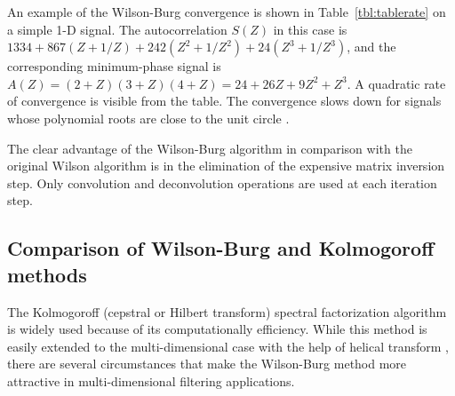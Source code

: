An example of the Wilson-Burg convergence is shown in
Table~\ref{tbl:tablerate} on a simple 1-D signal. The autocorrelation
$S(Z)$ in this case is $1334 + 867 \left(Z + 1/Z\right) + 242
\left(Z^2 + 1/Z^2\right) + 24 \left(Z^3 + 1/Z^3\right)$, and the
corresponding minimum-phase signal is $A(Z) = (2+Z)(3+Z)(4+Z) = 24 +
26 Z + 9 Z^2 + Z^3$. A quadratic rate of convergence is visible from
the table. The convergence slows down for signals whose polynomial
roots are close to the unit circle \cite{mywilson}.

The clear advantage of the Wilson-Burg algorithm in comparison with the
original Wilson algorithm is in the elimination of the expensive matrix
inversion step. Only convolution and deconvolution operations are used at each
iteration step.

\subsection{Comparison of Wilson-Burg and Kolmogoroff methods}
The Kolmogoroff (cepstral or Hilbert transform) spectral factorization
algorithm \cite{kolmog,Claerbout.fgdp.76,oppenheim} is widely used because of
its computationally efficiency. While this method is easily extended to the
multi-dimensional case with the help of helical transform
\cite{SEG-1999-16751678}, there are several circumstances that make the
Wilson-Burg method more attractive in multi-dimensional filtering
applications.

